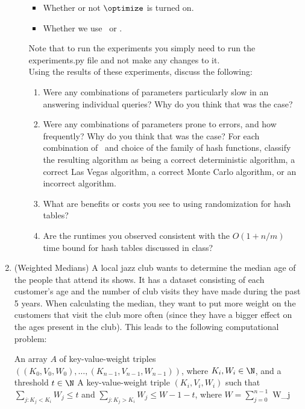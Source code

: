 \documentclass[11pt]{article}
\begin{document}
\begin{enumerate}
\begin{enumerate}
\begin{itemize}
        \item Whether or not $\optimize$ is turned on.
        \item Whether we use \DeterministicHash\ or 
        \RandomHash.
    \end{itemize}
    Note that to run the experiments you simply need to run the experiments.py file and not make any changes to it.\\
    Using the results of these experiments, discuss the following:
    \begin{enumerate}
        \item Were any combinations of parameters particularly slow in an answering individual queries?  Why do you think that was the case?
        \item Were any combinations of parameters prone to errors, and how frequently?  Why do you think that was the case?  For each combination of \optimize\ and choice of the family of hash functions, classify the resulting algorithm as being a correct deterministic algorithm, a correct Las Vegas algorithm, a correct Monte Carlo algorithm, or an incorrect algorithm.
        \item What are benefits or costs you see to using randomization for hash tables?
        \item Are the runtimes you observed consistent with the $O(1+n/m)$ time bound for hash tables discussed in class?


 
    

\end{enumerate}
\end{enumerate}


\item (Weighted Medians)  
    A local jazz club wants to determine the median age of the people that attend its shows. It has a dataset consisting of each customer's age and the number of club visits they have made during the past 5 years.  When calculating the median, they want to put more weight on the customers that visit the club more often (since they have a bigger effect on the ages present in the club).  This leads to the following computational problem:

    \compprob{\WeightedSelection}
{An array $A$ of key-value-weight triples $((K_0,V_0,W_0),\ldots,(K_{n-1},V_{n-1},W_{n-1}))$, where $K_i, W_i\in \N$,  and a threshold $t\in \N$}
{ A key-value-weight triple $(K_i,V_i,W_i)$ such that $\sum_{j : K_j<K_i} W_j \leq t$ and 
$\sum_{j : K_j>K_i} W_j \leq W-1-t$, where $W=\sum_{j=0}^{n-1}$ W_j}



\end{enumerate}
\end{document}
